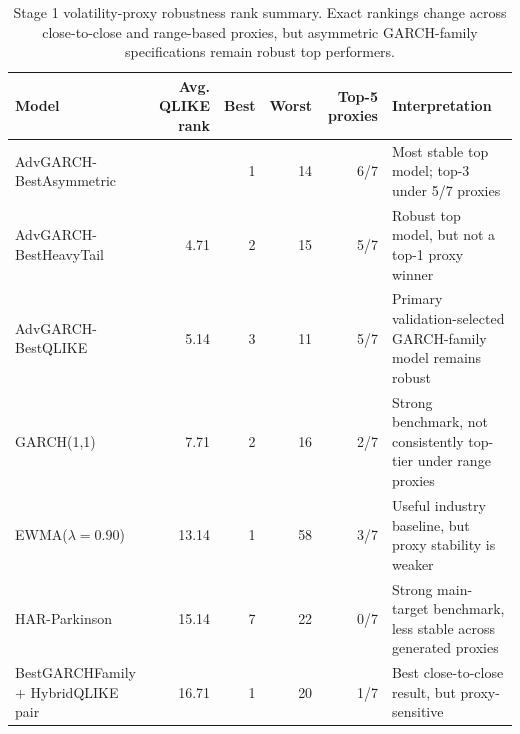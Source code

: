 \begin{table}[!t]
\centering
\caption{Stage 1 volatility-proxy robustness rank summary. Exact rankings change across close-to-close and range-based proxies, but asymmetric GARCH-family specifications remain robust top performers.}
\label{tab:proxy-robustness}
\scriptsize
\setlength{\tabcolsep}{4pt}
\begin{tabular}{@{}L{0.25\textwidth}r r r r L{0.24\textwidth}@{}}
\toprule
Model & Avg. QLIKE rank & Best & Worst & Top-5 proxies & Interpretation \\
\midrule
AdvGARCH-BestAsymmetric &  & 1 & 14 & 6/7 & Most stable top model; top-3 under 5/7 proxies \\
AdvGARCH-BestHeavyTail & 4.71 & 2 & 15 & 5/7 & Robust top model, but not a top-1 proxy winner \\
AdvGARCH-BestQLIKE & 5.14 & 3 & 11 & 5/7 & Primary validation-selected GARCH-family model remains robust \\
GARCH(1,1) & 7.71 & 2 & 16 & 2/7 & Strong benchmark, not consistently top-tier under range proxies \\
EWMA(\(\lambda=0.90\)) & 13.14 & 1 & 58 & 3/7 & Useful industry baseline, but proxy stability is weaker \\
HAR-Parkinson & 15.14 & 7 & 22 & 0/7 & Strong main-target benchmark, less stable across generated proxies \\
BestGARCHFamily + HybridQLIKE pair & 16.71 & 1 & 20 & 1/7 & Best close-to-close result, but proxy-sensitive \\
\bottomrule
\end{tabular}
\end{table}
